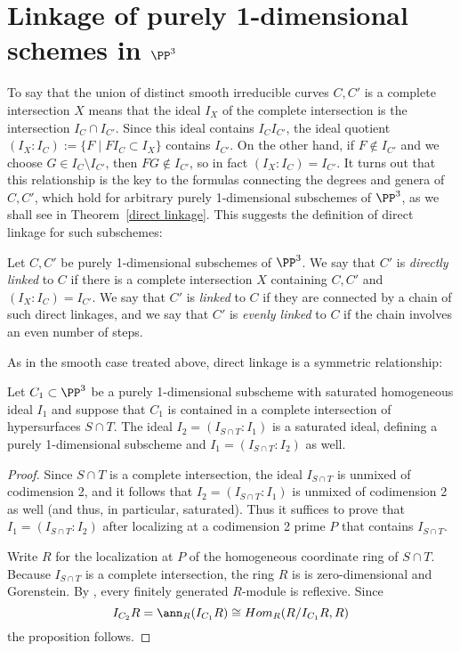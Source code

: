 \section{Linkage of purely 1-dimensional schemes in $\PP^3$}
To say that the union of distinct smooth irreducible curves $C, C'$  is a complete intersection $X$ means that 
the ideal $I_X$ of the complete intersection is the intersection $I_C\cap I_{C'}$. Since this ideal contains $I_CI_{C'}$, the ideal quotient
$(I_X:I_C) := \{F \mid FI_C\subset I_X\}$
contains $I_{C'}$. On the other hand, if $F \notin I_{C'}$ and we choose $G\in I_C\setminus I_{C'}$, then $FG\notin I_{C'}$, so in fact
$(I_X:I_C) = I_{C'}$. It turns out that this relationship is the key to the formulas connecting the degrees and genera of $C,C'$, which hold 
for arbitrary purely 1-dimensional subschemes of $\PP^3$, as we shall see in Theorem~\ref{direct linkage}. This suggests the definition
of direct linkage for such subschemes:

\begin{definition}
Let $C,C'$ be purely 1-dimensional subschemes of $\PP^3$. We say that $C'$ is \emph{directly linked} to $C$ if there is a complete
intersection $X$ containing $C,C'$ and $(I_X:I_C) = I_{C'}$. We say that $C'$ is \emph{linked} to $C$ if they are connected by a chain of such
direct linkages, and we say that $C'$ is \emph{evenly linked} to $C$ if the chain involves an even number of steps.
\end{definition}

As in the smooth case treated above, direct linkage is a symmetric relationship:
\begin{proposition}
Let $C_1\subset \PP^3$ be a purely 1-dimensional subscheme with saturated homogeneous ideal $I_1$ and suppose that $C_1$ is contained in a complete intersection of
hypersurfaces $S\cap T$. The ideal $I_2 = (I_{S\cap T}:I_1)$ is a saturated ideal, defining a purely 1-dimensional subscheme and 
$I_1 = (I_{S\cap T}: I_2)$ as well.
\end{proposition}
 
\begin{proof}
Since $S\cap T$ is a complete intersection, the ideal $I_{S\cap T}$ is unmixed of codimension 2, and it follows
that $I_2 = (I_{S\cap T}:I_1)$ is unmixed of codimension 2 as well (and thus, in particular, saturated).
Thus it suffices to prove that $I_1 = (I_{S\cap T}: I_2)$ after localizing at a codimension 2 prime $P$
that contains $I_{S\cap T}$. 

Write $R$ for the localization at $P$ of the homogeneous coordinate ring of $S\cap T$. 
Because $I_{S\cap T}$ is a complete intersection, the ring $R$ is
 is zero-dimensional and Gorenstein.
By \cite[***]{Eisenbud1995}, every finitely generated $R$-module is reflexive. Since 
$$
I_{C_2}R= \ann_{R}(I_{C_1}R) \cong Hom_R(R/I_{C_1}R, R)
$$
the proposition follows.
\end{proof}

